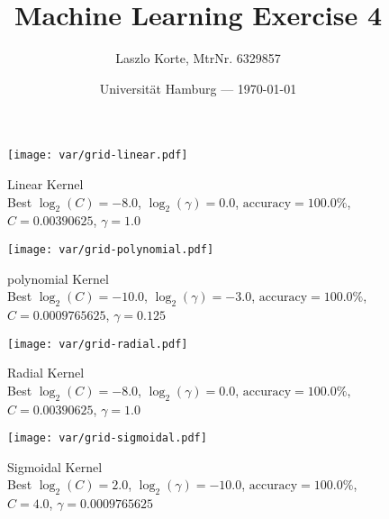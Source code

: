 \documentclass[parskip=half,a4paper,portrait]{scrartcl}
\title{Machine Learning Exercise 4}
\author{Laszlo Korte, MtrNr. 6329857}
\date{Universität Hamburg --- \today}
\begin{document}
\maketitle

\begin{figure}[H]
\begin{center}
\texttt{[image: var/grid-linear.pdf]}
\caption[Grid search with linear kernel]{Linear Kernel\\Best $\log_2(C) = -8.0$,
$\log_2(\gamma) = 0.0$,
$\text{accuracy} = 100.0\%$,
$C = 0.00390625$, $\gamma = 1.0$}
\end{center}
\end{figure}

\begin{figure}[H]
\begin{center}
\texttt{[image: var/grid-polynomial.pdf]}
\caption[Grid search with polynomial kernel]{polynomial Kernel\\Best $\log_2(C) = -10.0$, $\log_2(\gamma) = -3.0$, $\text{accuracy} = 100.0\%$, $C = 0.0009765625$, $\gamma = 0.125$}
\end{center}
\end{figure}

\begin{figure}[H]
\begin{center}
\texttt{[image: var/grid-radial.pdf]}
\caption[Grid search with Radial kernel]{Radial Kernel\\Best $\log_2(C) = -8.0$, $\log_2(\gamma) = 0.0$, $\text{accuracy} = 100.0\%$, $C = 0.00390625$, $\gamma = 1.0$}
\end{center}
\end{figure}

\begin{figure}[H]
\begin{center}
\texttt{[image: var/grid-sigmoidal.pdf]}
\caption[Grid search with Sigmoidal kernel]{Sigmoidal Kernel\\Best $\log_2(C) = 2.0$, $\log_2(\gamma) = -10.0$, $\text{accuracy} = 100.0\%$, $C = 4.0$, $\gamma = 0.0009765625$}
\end{center}
\end{figure}
\end{document}
